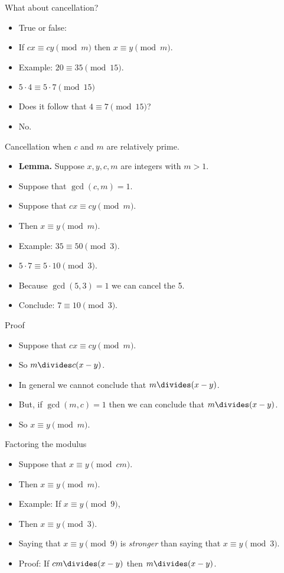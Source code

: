 \documentclass[handout]{beamer}
\begin{document}
\begin{frame}{What about cancellation?}

\begin{itemize}
  \item True or false:
  \item If $cx \equiv cy \pmod m$ then $x\equiv y \pmod m$.
  \item Example: $20 \equiv 35 \pmod {15}$.
  \item $5\cdot 4 \equiv 5 \cdot 7 \pmod {15}$
  \item Does it follow that $4 \equiv 7 \pmod {15}$?
  \item No.
\end{itemize}

\end{frame}

\begin{frame}{Cancellation when $c$ and $m$ are relatively prime.}
\begin{itemize}
  \item \textbf{Lemma.} Suppose $x,y,c,m$ are integers with $m>1$.
  \item Suppose that $\gcd(c, m) = 1$.
  \item Suppose that $cx \equiv cy \pmod m$.
  \item Then $x\equiv y \pmod m$.
  \item Example: $35 \equiv 50 \pmod 3$.
  \item $5\cdot 7 \equiv 5 \cdot 10 \pmod 3$.
  \item Because $\gcd(5,3) = 1$ we can cancel the 5.
  \item Conclude: $7\equiv 10 \pmod 3$.
\end{itemize}
\end{frame}

\begin{frame}{Proof}
\begin{itemize}
  \item Suppose that $cx \equiv cy \pmod m$.
  \item So $m \divides c(x-y)$.
  \item In general we cannot conclude that $m \divides (x-y)$.
  \item But, if $\gcd(m,c) = 1$ then we can conclude that $m\divides (x-y)$.
  \item So $x\equiv y \pmod m$.
\end{itemize}
\end{frame}

\begin{frame}{Factoring the modulus}
\begin{itemize}
  \item Suppose that $x\equiv y \pmod {cm}$.
  \item Then $x\equiv y \pmod m$.
  \item Example: If $x\equiv y \pmod 9$,
  \item Then $x\equiv y \pmod 3$.
  \item Saying that $x\equiv y \pmod 9$ is \emph{stronger} than saying that $x\equiv y \pmod 3$.
  \item Proof: If $cm \divides (x-y)$ then $m\divides (x-y)$.
\end{itemize}
\end{frame}
\end{document}
